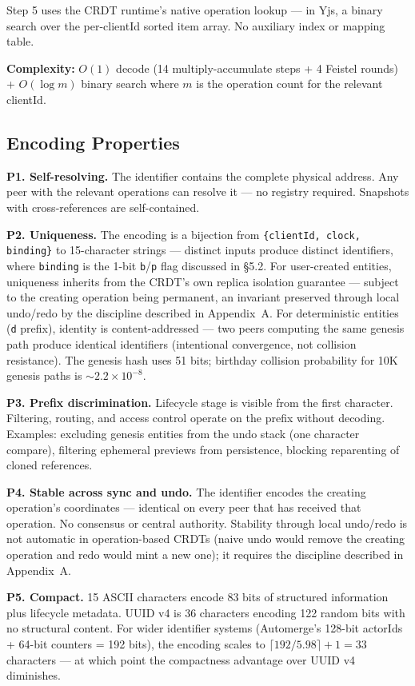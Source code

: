 Step 5 uses the CRDT runtime's native operation lookup --- in Yjs, a binary search over the per-clientId sorted item array. No auxiliary index or mapping table.

\textbf{Complexity:} $O(1)$ decode (14 multiply-accumulate steps + 4 Feistel rounds) + $O(\log m)$ binary search where $m$ is the operation count for the relevant clientId.

\subsection{Encoding Properties}

\textbf{P1. Self-resolving.} The identifier contains the complete physical address. Any peer with the relevant operations can resolve it --- no registry required. Snapshots with cross-references are self-contained.

\textbf{P2. Uniqueness.} The encoding is a bijection from \texttt{\{clientId, clock, binding\}} to 15-character strings --- distinct inputs produce distinct identifiers, where \texttt{binding} is the 1-bit \texttt{b}/\texttt{p} flag discussed in \S5.2. For user-created entities, uniqueness inherits from the CRDT's own replica isolation guarantee --- subject to the creating operation being permanent, an invariant preserved through local undo/redo by the discipline described in Appendix~A. For deterministic entities (\texttt{d} prefix), identity is content-addressed --- two peers computing the same genesis path produce identical identifiers (intentional convergence, not collision resistance). The genesis hash uses 51 bits; birthday collision probability for 10K genesis paths is ${\sim}2.2 \times 10^{-8}$.

\textbf{P3. Prefix discrimination.} Lifecycle stage is visible from the first character. Filtering, routing, and access control operate on the prefix without decoding. Examples: excluding genesis entities from the undo stack (one character compare), filtering ephemeral previews from persistence, blocking reparenting of cloned references.

\textbf{P4. Stable across sync and undo.} The identifier encodes the creating operation's coordinates --- identical on every peer that has received that operation. No consensus or central authority. Stability through local undo/redo is not automatic in operation-based CRDTs (naive undo would remove the creating operation and redo would mint a new one); it requires the discipline described in Appendix~A.

\textbf{P5. Compact.} 15 ASCII characters encode 83 bits of structured information plus lifecycle metadata. UUID v4 is 36 characters encoding 122 random bits with no structural content. For wider identifier systems (Automerge's 128-bit actorIds + 64-bit counters = 192 bits), the encoding scales to $\lceil 192/5.98 \rceil + 1 = 33$ characters --- at which point the compactness advantage over UUID v4 diminishes.

